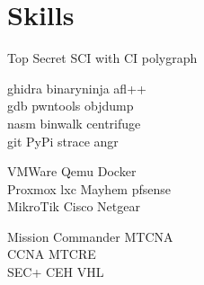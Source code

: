 \documentclass[]{resume}
\begin{document}
%
%
\header


%
%
\begin{minipage}[t]{0.30\textwidth}

\section{Skills}

Top Secret SCI with CI polygraph

\sectionsep

ghidra \textbullet{} binaryninja \textbullet{} afl++ \\
gdb \textbullet{} pwntools \textbullet{} objdump \\
nasm \textbullet{} binwalk \textbullet{} centrifuge \\
git \textbullet{} PyPi \textbullet{} strace \textbullet{} angr \\

\sectionsep

VMWare \textbullet{} Qemu \textbullet{} Docker \\
Proxmox \textbullet{} lxc \textbullet{} Mayhem \textbullet{} pfsense \\
MikroTik \textbullet{} Cisco \textbullet{} Netgear \\


\sectionsep

Mission Commander \textbullet{} MTCNA \\
CCNA \textbullet{} MTCRE \\
SEC+ \textbullet{} CEH \textbullet{} VHL \\


\sectionsep



\end{minipage}
\end{document}
